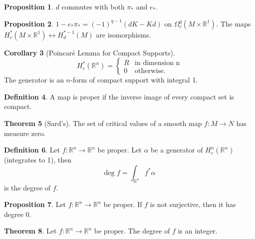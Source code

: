 \documentclass[twocolumn]{article}
\theoremstyle{definition}
\newtheorem{definition}{Definition}[section]
\newtheorem{theorem}[definition]{Theorem}
\newtheorem{proposition}[definition]{Proposition}
\newtheorem{corollary}[definition]{Corollary}
\theoremstyle{remark}
\begin{document}
\begin{proposition}
    $d$ commutes with both $\pi_*$ and $e_*$.
\end{proposition}
\begin{proposition}
    $1 - e_* \pi_* = (-1)^{q-1}(dK - Kd)$ on $\Omega^q_c(M \times \mathbb{R}^1)$.
    The maps $H_c^*(M\times \mathbb{R}^1) \leftrightarrow H_d^{*-1}(M)$ are isomorphisms.
\end{proposition}
\begin{corollary}[Poincaré Lemma for Compact Supports]
    \begin{equation}
        H^*_c(\mathbb{R}^n) =
        \begin{cases}
            R & \textrm{in dimension n}\\
            0 & \textrm{otherwise.}
        \end{cases}
    \end{equation}
    The generator is an $n$-form of compact support with integral 1.
\end{corollary}
\begin{definition}
    A map is proper if the inverse image of every compact set is compact.
\end{definition}
\begin{theorem}[Sard's]
    The set of critical values of a smooth map $f: M \rightarrow N$ has measure zero.
\end{theorem}
\begin{definition}
    Let $f: \mathbb{R}^n \rightarrow \mathbb{R}^n$ be proper. Let $\alpha$ be a generator
    of $H^n_c(\mathbb{R}^n)$(integrates to 1), then
    \begin{equation}
        \textrm{deg }f = \int_{\mathbb{R}^n} f^*\alpha
    \end{equation}
    is the degree of $f$.
\end{definition}
\begin{proposition}
    Let $f: \mathbb{R}^n \rightarrow \mathbb{R}^n$ be proper. If $f$ is not surjective, then it has degree 0.
\end{proposition}
\begin{theorem}
    Let $f: \mathbb{R}^n \rightarrow \mathbb{R}^n$ be proper. The degree of $f$ is an integer.
\end{theorem}
\end{document}
